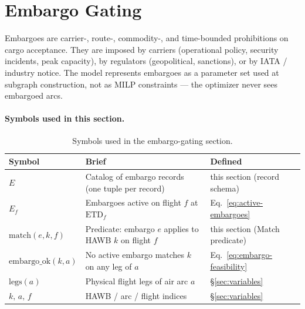 \documentclass[11pt,a4paper]{article}
\theoremstyle{definition}
\begin{document}
\section{Embargo Gating}
\label{sec:embargo}

Embargoes are carrier-, route-, commodity-, and time-bounded prohibitions on
cargo acceptance. They are imposed by carriers (operational policy, security
incidents, peak capacity), by regulators (geopolitical, sanctions), or by
IATA / industry notice. The model represents embargoes as a parameter set
used at subgraph construction, not as MILP constraints --- the optimizer never
sees embargoed arcs.

\paragraph{Symbols used in this section.}
\begin{table}[H]
\centering
\caption{Symbols used in the embargo-gating section.}
\label{tab:embargo-syms}
\begin{tabular}{lp{9cm}p{3.5cm}}
\toprule
Symbol & Brief & Defined \\
\midrule
$E$ & Catalog of embargo records (one tuple per record) & this section (record schema) \\
$E_f$ & Embargoes active on flight $f$ at $\text{ETD}_f$ & Eq.~\ref{eq:active-embargoes} \\
$\text{match}(e, k, f)$ & Predicate: embargo $e$ applies to HAWB $k$ on flight $f$ & this section (Match predicate) \\
$\text{embargo\_ok}(k, a)$ & No active embargo matches $k$ on any leg of $a$ & Eq.~\ref{eq:embargo-feasibility} \\
$\text{legs}(a)$ & Physical flight legs of air arc $a$ & \S\ref{sec:variables} \\
$k,\, a,\, f$ & HAWB / arc / flight indices & \S\ref{sec:variables} \\
\bottomrule
\end{tabular}
\end{table}
\end{document}
